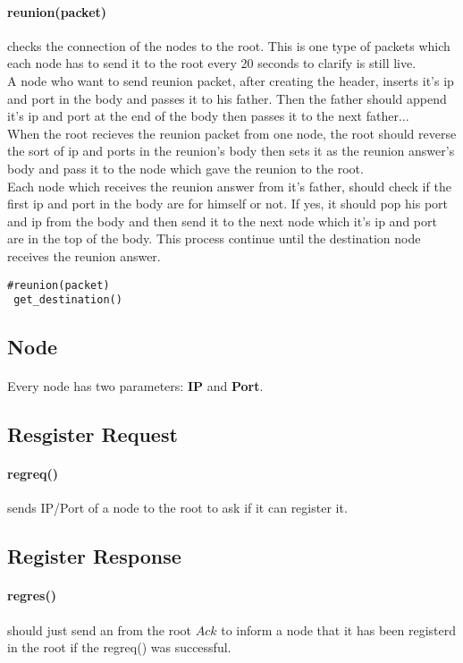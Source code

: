 \documentclass{article}
\begin{document}
\paragraph{reunion(packet)} checks the connection of the nodes to the root. This is one type of packets which each node has to send it to the root every 20 seconds to clarify is still live. \\
A node who want to send reunion packet, after creating the header, inserts it's ip and port in the body and passes it to his father. Then the father should append it's ip and port at the end of the body then passes it to the next father... \\
When the root recieves the reunion packet from one node, the root should reverse the sort of ip and ports in the reunion's body then sets it as the reunion answer's body and pass it to the node which gave the reunion to the root. \\
Each node which receives the reunion answer from it's father, should check if the first ip and port in the body are for himself or not. If yes, it should pop his port and ip from the body and then send it to the next node which it's ip and port are in the top of the body.
This process continue until the destination node receives the reunion answer.
\begin{lstlisting}
#reunion(packet)
 get_destination()
\end{lstlisting}
\subsection{Node}
\paragraph{}Every node has two parameters: \textbf{IP} and \textbf{Port}.
\subsection{Resgister Request}
\paragraph{reg\underline{\hspace{.05in}}req()} sends IP/Port of a node to the root to ask if it can register it. 
\subsection{Register Response}
\paragraph{reg\underline{\hspace{.05in}}res()} should just send an from the root $Ack$ to inform a node that it has been registerd in the root if the reg\underline{\hspace{.05in}}req() was successful.
\end{document}
